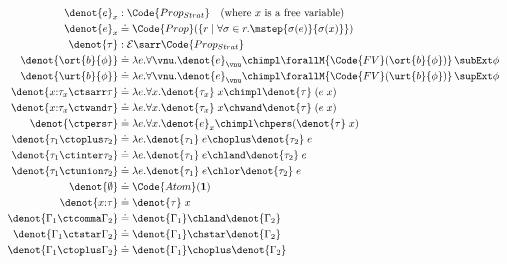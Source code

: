 \begin{align*}
  \\\denot{e}_x &: \Code{Prop_{Strat}} \quad (\text{where $x$ is a free variable})
  \\\denot{e}_x &\doteq \Code{Prop}(\{r \mid \forall \sigma \in r. \mstep{\sigma(e)}{\sigma(x)} \})
  \\\denot{\tau} &: \mathcal{E} \sarr \Code{Prop_{Strat}}
  \\\denot{\ort{b}{\phi}} &\doteq \lambda e. \forall \vnu. \denot{e}_\vnu \chimpl \forallM{\Code{FV}(\ort{b}{\phi})}\,\subExt \phi
  \\\denot{\urt{b}{\phi}} &\doteq \lambda e. \forall \vnu. \denot{e}_\vnu \chimpl \forallM{\Code{FV}(\urt{b}{\phi})}\,\supExt \phi
  \\\denot{x{:}\tau_x \ctsarr \tau} &\doteq \lambda e. \forall x.\denot{\tau_x}\;x \chimpl \denot{\tau}\;(e\;x)
  \\\denot{x{:}\tau_x \ctwand \tau} &\doteq \lambda e. \forall x.\denot{\tau_x}\;x \chwand \denot{\tau}\;(e\;x)
  \\\denot{\ctpers \tau} &\doteq \lambda e. \forall x.\denot{e}_x \chimpl \chpers  (\denot{\tau}\;x)
  \\\denot{\tau_1 \ctoplus \tau_2} &\doteq \lambda e. \denot{\tau_1}\;e \choplus \denot{\tau_2}\;e
  \\\denot{\tau_1 \ctinter \tau_2} &\doteq \lambda e. \denot{\tau_1}\;e \chland \denot{\tau_2}\;e
  \\\denot{\tau_1 \ctunion \tau_2} &\doteq \lambda e. \denot{\tau_1}\;e \chlor \denot{\tau_2}\;e
  \\\denot{\emptyset} &\doteq \Code{Atom}(\textbf{1})
  \\\denot{x{:}\tau} &\doteq \denot{\tau}\;x
  \\\denot{\Gamma_1 \ctcomma \Gamma_2} &\doteq \denot{\Gamma_1} \chland \denot{\Gamma_2}
  \\\denot{\Gamma_1 \ctstar \Gamma_2} &\doteq \denot{\Gamma_1} \chstar \denot{\Gamma_2}
  \\\denot{\Gamma_1 \ctoplus \Gamma_2} &\doteq \denot{\Gamma_1} \choplus \denot{\Gamma_2}
\end{align*}\noindent

